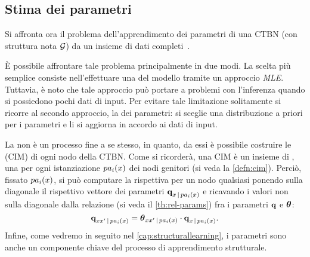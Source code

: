\subsection{Stima dei parametri}\label{subsec:ctbn-params}
Si affronta ora il problema dell'apprendimento dei parametri di una \acl{CTBN} (con struttura nota $\mathcal{G}$) da un insieme di dati completi~\citep[si veda][sezione 5.1]{Nodelman2007}.

\`E possibile affrontare tale problema principalmente in due modi. La scelta più semplice consiste nell'effettuare una  del modello tramite un approccio \emph{\acl{MLE}}. Tuttavia, è noto che tale approccio può portare a problemi con l'inferenza quando si possiedono pochi dati di input. Per evitare tale limitazione solitamente si ricorre al secondo approccio, la \emph{} dei parametri: si sceglie una distribuzione a priori per i parametri e li si aggiorna in accordo ai dati di input.

La  non è un processo fine a se stesso, in quanto,  da essi è possibile costruire le \cim{} (\acs{CIM}) di ogni nodo della \acs{CTBN}. Come si ricorderà, una \acs{CIM} è un insieme di \im{}, una per ogni istanziazione $pa_i(\mathnormal{x})$ dei nodi genitori (si veda la \autoref{defn:cim}). Perciò, fissato $pa_i(\mathnormal{x})$, si può computare la rispettiva \im*{} per un nodo qualsiasi ponendo sulla diagonale il rispettivo vettore dei parametri $\boldsymbol{\textbf{\text{q}}}_{\mathnormal{x}\,\arrowvert\,pa_i(\mathnormal{x})}$ e ricavando i valori non sulla diagonale dalla relazione (si veda il \autoref{th:rel-params}) fra i parametri $\boldsymbol{\textbf{\text{q}}}$ e $\boldsymbol{\textbf{\text{$\theta$}}}$:
\begin{equation}
\label{eq:ctbn-params-rel}
\boldsymbol{\textbf{\text{q}}}_{\mathnormal{x}\mathnormal{x}^\prime\,\arrowvert\,pa_i(\mathnormal{x})}=\boldsymbol{\textbf{\text{$\theta$}}}_{\mathnormal{x}\mathnormal{x}^\prime\,\arrowvert\,pa_i(\mathnormal{x})} \cdot \boldsymbol{\textbf{\text{q}}}_{\mathnormal{x}\,\arrowvert\,pa_i(\mathnormal{x})}\text{.}
\end{equation}
Infine, come vedremo in seguito nel \autoref{cap:structurallearning}, i parametri sono anche un componente chiave del processo di apprendimento strutturale.

